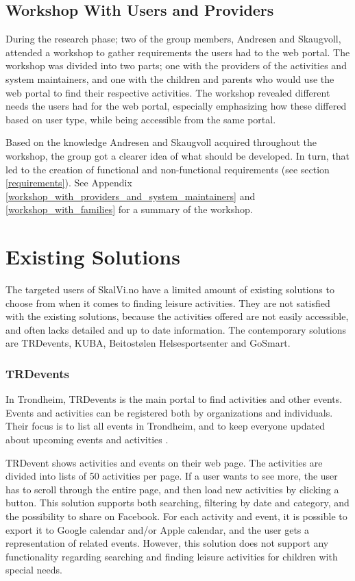 \subsection{Workshop With Users and Providers}
\label{WorkshopUserAndProviders}
During the research phase; two of the group members, Andresen and Skaugvoll, attended a workshop to gather requirements the users had to the web portal. The workshop was divided into two parts; one with the providers of the activities and system maintainers, and one with the children and parents who would use the web portal to find their respective activities. The workshop revealed different needs the users had for the web portal, especially emphasizing how these differed based on user type, while being accessible from the same portal. 

Based on the knowledge Andresen and Skaugvoll acquired throughout the workshop, the group got a clearer idea of what should be developed. In turn, that led to the creation of functional and non-functional requirements (see section \ref{requirements}). See Appendix \ref{workshop_with_providers_and_system_maintainers} and \ref{workshop_with_families} for a summary of the workshop.


\section{Existing Solutions}
\label{alternativeSolutions}
The targeted users of SkalVi.no have a limited amount of existing solutions to choose from when it comes to finding leisure activities. They are not satisfied with the existing solutions, because the activities offered are not easily accessible, and often lacks detailed and up to date information.  
The contemporary solutions are TRDevents, KUBA, Beitostølen Helsesportsenter and GoSmart.

\subsubsection{TRDevents}
In Trondheim, TRDevents is the main portal to find activities and other events. Events and activities can be registered both by organizations and individuals. Their focus is to list all events in Trondheim, and to keep everyone updated about upcoming events and activities \cite{TRDevents}. 

TRDevent shows activities and events on their web page. The activities are divided into lists of 50 activities per page. If a user wants to see more, the user has to scroll through the entire page, and then load new activities by clicking a button. This solution supports both searching, filtering by date and category, and the possibility to share on Facebook. For each activity and event, it is possible to export it to Google calendar and/or Apple calendar, and the user gets a representation of related events. However, this solution does not support any functionality regarding searching and finding leisure activities for children with special needs.

